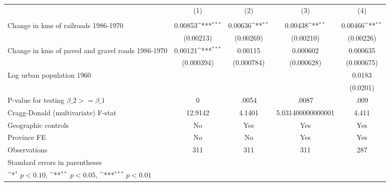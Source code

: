 {
\def\sym#1{\ifmmode^{#1}\else\(^{#1}\)\fi}
\begin{tabular}{l*{4}{c}}
\hline\hline
                &\multicolumn{1}{c}{(1)}&\multicolumn{1}{c}{(2)}&\multicolumn{1}{c}{(3)}&\multicolumn{1}{c}{(4)}\\
                &\multicolumn{1}{c}{}&\multicolumn{1}{c}{}&\multicolumn{1}{c}{}&\multicolumn{1}{c}{}\\
\hline
Change in kms of railroads 1986-1970&  0.00853\sym{***}&  0.00636\sym{**} &  0.00438\sym{**} &  0.00466\sym{**} \\
                &(0.00213)         &(0.00269)         &(0.00210)         &(0.00226)         \\
[1em]
Change in kms of paved and gravel roads 1986-1970&  0.00121\sym{***}&  0.00115         & 0.000602         & 0.000635         \\
                &(0.000394)         &(0.000784)         &(0.000628)         &(0.000675)         \\
[1em]
Log urban population 1960&                  &                  &                  &   0.0183         \\
                &                  &                  &                  & (0.0201)         \\
\hline
P-value for testing $\beta\_{2} >= \beta\_{1}$&        0         &    .0054         &    .0087         &     .009         \\
Cragg-Donald (multivariate) F-stat&  12.9142         &   4.1401         &5.031400000000001         &    4.411         \\
Geographic controls&       No         &      Yes         &      Yes         &      Yes         \\
Province FE     &       No         &       No         &      Yes         &      Yes         \\
Observations    &      311         &      311         &      311         &      287         \\
\hline\hline
\multicolumn{5}{l}{\footnotesize Standard errors in parentheses}\\
\multicolumn{5}{l}{\footnotesize \sym{*} \(p<0.10\), \sym{**} \(p<0.05\), \sym{***} \(p<0.01\)}\\
\end{tabular}
}
